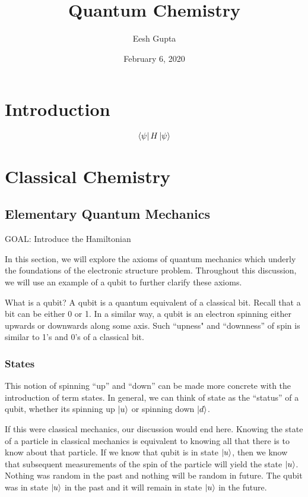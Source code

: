 \documentclass{article}
\title{Quantum Chemistry}
\author{Eesh Gupta }
\date{February 6, 2020}
\begin{document}
\maketitle
\tableofcontents
\newpage
\section{Introduction}
\[\bra{\psi}H\ket{\psi}\]
\section{Classical Chemistry}
  \subsection{Elementary Quantum Mechanics}
  GOAL: Introduce the Hamiltonian

  In this section, we will explore the axioms of quantum mechanics
  which underly the foundations of the electronic structure problem. Throughout
  this discussion, we will use an example of a qubit to further clarify these
  axioms.

  What is a qubit? A qubit is a quantum equivalent of a classical bit. Recall
  that a bit can be either 0 or 1.
  In a similar way, a qubit is an electron spinning either upwards or
  downwards along some axis. Such
  ``upness" and ``downness''  of spin is similar to 1's and 0's of a classical
  bit.
  \subsubsection{States}
  This notion of spinning ``up'' and ``down'' can be made more concrete with
  the introduction of term states. In general, we can think of state as the
  ``status'' of a qubit, whether its spinning up \(\ket{u}\) or spinning
  down \(\ket{d}\).

  If this were classical mechanics, our discussion would end here. Knowing the
  state of a particle in classical mechanics is equivalent to knowing all that
  there is to know about that particle. If we know that qubit is in state
  \(\ket{u}\), then we know that subsequent measurements of the spin of the
  particle will yield the state \(\ket{u}\). Nothing was random in the past
  and nothing will be random in future. The qubit was in state \(\ket{u}\) in
  the past and it will remain in state \(\ket{u}\) in the future.
\end{document}
